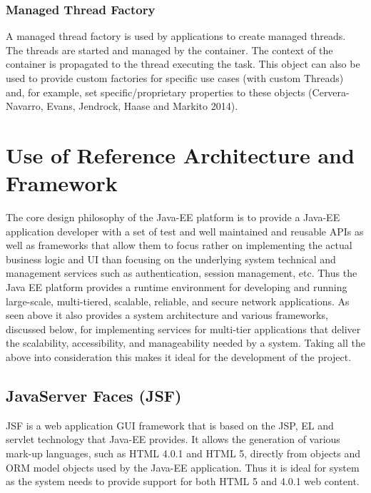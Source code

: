 \documentclass[12pt]{article}
\begin{document}
\subsubsection{Managed Thread Factory}
A managed thread factory is used by applications to create managed threads. The threads are started and managed by the container. The context of the container is propagated to the thread executing the task. This object can also be used to provide custom factories for specific use cases (with custom Threads) and, for example, set specific/proprietary properties to these objects (Cervera-Navarro, Evans, Jendrock, Haase and Markito 2014).


\section{Use of Reference Architecture and Framework}
The core design philosophy of the Java-EE platform is to provide a Java-EE application developer with a set of test and well maintained and reusable APIs as well as frameworks that allow them to focus rather on implementing the actual business logic and UI than focusing on the underlying system technical and management services such as authentication, session management, etc. Thus the Java EE platform provides a runtime environment for developing and running large-scale, multi-tiered, scalable, reliable, and secure network applications. As seen above it also provides a system architecture and various frameworks, discussed below, for implementing services for multi-tier applications that deliver the scalability, accessibility, and manageability needed by a system. Taking all the above into consideration this makes it ideal for the development of the project.

\subsection{JavaServer Faces (JSF)}
JSF is a web application GUI framework that is based on the JSP, EL and servlet technology that Java-EE provides. It allows the generation of various mark-up languages, such as HTML 4.0.1 and HTML 5, directly from objects and ORM model objects used by the Java-EE application. Thus it is ideal for system as the system needs to provide support for both HTML 5 and 4.0.1 web content.
\end{document}
